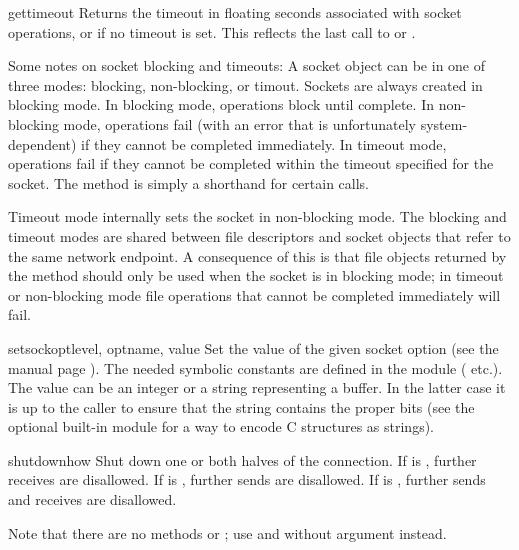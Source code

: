 \begin{methoddesc}[socket]{gettimeout}{}
Returns the timeout in floating seconds associated with socket
operations, or  if no timeout is set.  This reflects
the last call to  or .
\end{methoddesc}

Some notes on socket blocking and timeouts: A socket object can be in
one of three modes: blocking, non-blocking, or timout.  Sockets are
always created in blocking mode.  In blocking mode, operations block
until complete.  In non-blocking mode, operations fail (with an error
that is unfortunately system-dependent) if they cannot be completed
immediately.  In timeout mode, operations fail if they cannot be
completed within the timeout specified for the socket.  The
 method is simply a shorthand for certain
 calls.

Timeout mode internally sets the socket in non-blocking mode.  The
blocking and timeout modes are shared between file descriptors and
socket objects that refer to the same network endpoint.  A consequence
of this is that file objects returned by the 
method should only be used when the socket is in blocking mode; in
timeout or non-blocking mode file operations that cannot be completed
immediately will fail.

\begin{methoddesc}[socket]{setsockopt}{level, optname, value}
Set the value of the given socket option (see the \UNIX{} manual page
).  The needed symbolic constants are defined in
the  module ( etc.).  The value can be an
integer or a string representing a buffer.  In the latter case it is
up to the caller to ensure that the string contains the proper bits
(see the optional built-in module
 for a way to encode C
structures as strings). 
\end{methoddesc}

\begin{methoddesc}[socket]{shutdown}{how}
Shut down one or both halves of the connection.  If  is
, further receives are disallowed.  If  is ,
further sends are disallowed.  If  is , further sends
and receives are disallowed.
\end{methoddesc}

Note that there are no methods  or ;
use  and  without  argument
instead.


